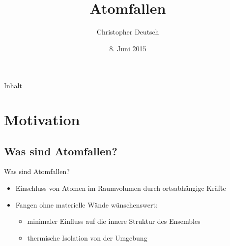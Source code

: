 \documentclass[12pt,xcolor=dvipsnames]{beamer}
\author[Christopher Deutsch]
{Christopher Deutsch}
\title
{Atomfallen}
\subtitle
{}
\institute[]
{Rheinische Friedrich-Wilhelms-Universität Bonn \\
Proseminar Präsentationstechnik SS15}
\date{8. Juni 2015}
\begin{document}
\maketitle

\begin{frame}{Inhalt}
	\tableofcontents
\end{frame}


\section{Motivation}

\subsection{Was sind Atomfallen?}
\begin{frame}{Was sind Atomfallen?}
	\begin{itemize}
		\item Einschluss von Atomen im Raumvolumen durch ortsabhängige Kräfte
		
		\item Fangen ohne materielle Wände wünschenswert:
		\begin{itemize}
			\item minimaler Einfluss auf die innere Struktur des Ensembles
			
			\item thermische Isolation von der Umgebung
		\end{itemize}

	\end{itemize}
\end{frame}
\end{document}
